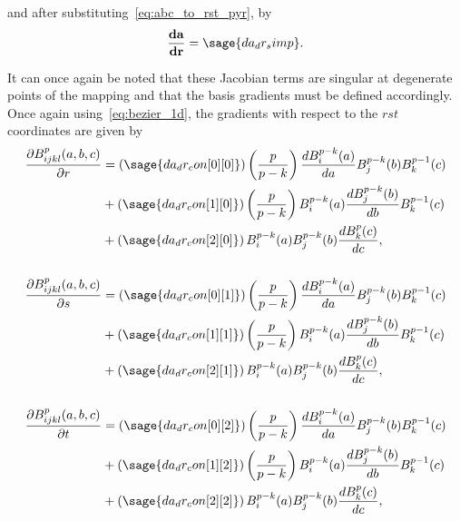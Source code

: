 \documentclass{article}
\numberwithin{equation}{section}
\newcommand{\vect}[1]{\mathbf{{#1}}}
\newcommand{\mat}[1]{\mathbf{{#1}}}
\begin{document}
and after substituting~\eqref{eq:abc_to_rst_pyr}, by
\[
\mat{\frac{d\vect{a}}{d\vect{r}}} = \sage{da_dr_simp}.
\]

It can once again be noted that these Jacobian terms are singular at degenerate points of the mapping and that the basis
gradients must be defined accordingly. Once again using~\eqref{eq:bezier_1d}, the gradients with respect to the $rst$
coordinates are given by
\begin{align*}
\frac{\partial B^p_{ijkl}(a,b,c)}{\partial r}
& = \left(\sage{da_dr_con[0][0]}\right)\left(\frac{p}{p-k}\right) \frac{d B^{p-k}_i(a)}{da} B^{p-k}_j(b) B^{p-1}_k(c) \\
& + \left(\sage{da_dr_con[1][0]}\right)\left(\frac{p}{p-k}\right) B^{p-k}_i(a) \frac{d B^{p-k}_j(b)}{db} B^{p-1}_k(c) \\
& + \left(\sage{da_dr_con[2][0]}\right) B^{p-k}_i(a) B^{p-k}_j(b) \frac{d B^{p}_k(c)}{dc}, \\
\\
\frac{\partial B^p_{ijkl}(a,b,c)}{\partial s}
& = \left(\sage{da_dr_con[0][1]}\right)\left(\frac{p}{p-k}\right) \frac{d B^{p-k}_i(a)}{da} B^{p-k}_j(b) B^{p-1}_k(c) \\
& + \left(\sage{da_dr_con[1][1]}\right)\left(\frac{p}{p-k}\right) B^{p-k}_i(a) \frac{d B^{p-k}_j(b)}{db} B^{p-1}_k(c) \\
& + \left(\sage{da_dr_con[2][1]}\right) B^{p-k}_i(a) B^{p-k}_j(b) \frac{d B^{p}_k(c)}{dc}, \\
\\
\frac{\partial B^p_{ijkl}(a,b,c)}{\partial t}
& = \left(\sage{da_dr_con[0][2]}\right)\left(\frac{p}{p-k}\right) \frac{d B^{p-k}_i(a)}{da} B^{p-k}_j(b) B^{p-1}_k(c) \\
& + \left(\sage{da_dr_con[1][2]}\right)\left(\frac{p}{p-k}\right) B^{p-k}_i(a) \frac{d B^{p-k}_j(b)}{db} B^{p-1}_k(c) \\
& + \left(\sage{da_dr_con[2][2]}\right) B^{p-k}_i(a) B^{p-k}_j(b) \frac{d B^{p}_k(c)}{dc}, \\
\end{align*}





\end{document}
